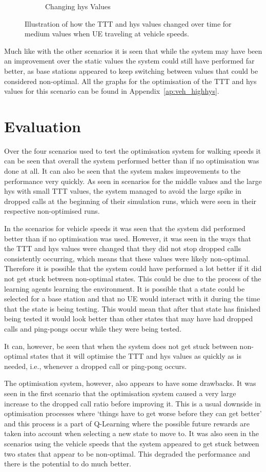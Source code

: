 \begin{figure}[H]
\begin{subfigure}[b]{0.49\textwidth}
                \caption{Changing hys Values}
                \label{fig:veh_highhys_hys}
        \end{subfigure}
        \caption{Illustration of how the TTT and hys values changed over time for medium values when UE traveling at vehicle speeds.}\label{fig:veh_highhys_ttthys}
\end{figure}
Much like with the other scenarios it is seen that while the system may have been an improvement over the static values the system could still have performed far better, as base stations appeared to keep switching between values that could be considered non-optimal. All the graphs for the optimisation of the TTT and hys values for this scenario can be found in Appendix~\ref{ap:veh_highhys}.
\section{Evaluation}
Over the four scenarios used to test the optimisation system for walking speeds it can be seen that overall the system performed better than if no optimisation was done at all. It can also be seen that the system makes improvements to the performance very quickly. As seen in scenarios for the middle values and the large hys with small TTT values, the system managed to avoid the large spike in dropped calls at the beginning of their simulation runs, which were seen in their respective non-optimised runs.

In the scenarios for vehicle speeds it was seen that the system did performed better than if no optimisation was used. However, it was seen in the ways that the TTT and hys values were changed that they did not stop dropped calls consistently occurring, which means that these values were likely non-optimal. Therefore it is possible that the system could have performed a lot better if it did not get stuck between non-optimal states. This could be due to the process of the learning agents learning the environment. It is possible that a state could be selected for a base station and that no UE would interact with it during the time that the state is being testing. This would mean that after that state has finished being tested it would look better than other states that may have had dropped calls and ping-pongs occur while they were being tested.

It can, however, be seen that when the system does not get stuck between non-optimal states that it will optimise the TTT and hys values as quickly as is needed, i.e., whenever a dropped call or ping-pong occurs.

The optimisation system, however, also appears to have some drawbacks. It was seen in the first scenario that the optimisation system caused a very large increase to the dropped call ratio before improving it. This is a usual downside in optimisation processes where `things have to get worse before they can get better' and this process is a part of Q-Learning where the possible future rewards are taken into account when selecting a new state to move to. It was also seen in the scenarios using the vehicle speeds that the system appeared to get stuck between two states that appear to be non-optimal. This degraded the performance and there is the potential to do much better.